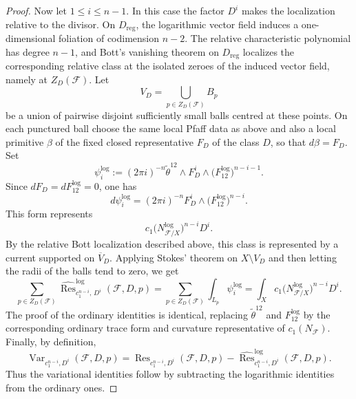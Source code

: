 \documentclass[10pt,a4paper]{amsart}
\newcommand{\cF}{\mathcal{F}}
\begin{document}
\begin{proof}
Now let \(1\leq i\leq n-1\). In this case the factor \(D^i\) makes the
localization relative to the divisor. On \(D_{\mathrm{reg}}\), the logarithmic
vector field induces a one-dimensional foliation of codimension \(n-2\). The
relative characteristic polynomial has degree \(n-1\), and Bott's vanishing
theorem on \(D_{\mathrm{reg}}\) localizes the corresponding relative class at
the isolated zeroes of the induced vector field, namely at \(Z_D(\cF)\).
Let
\[
V_D=\bigcup_{p\in Z_D(\cF)}B_p
\]
be a union of pairwise disjoint sufficiently small balls centred at these
points. On each punctured ball choose the same local Pfaff data as above and
also a local primitive \(\beta\) of the fixed closed representative \(F_D\) of
the class \(D\), so that \(d\beta=F_D\). Set
\[
\psi_i^{\log}
:=
(2\pi i)^{-n}
\widetilde\theta^{12}\wedge
F_D^i\wedge
\bigl(F_{12}^{\log}\bigr)^{n-i-1}.
\]
Since \(dF_D=dF_{12}^{\log}=0\), one has
\[
d\psi_i^{\log}
=
(2\pi i)^{-n}
F_D^i\wedge
\bigl(F_{12}^{\log}\bigr)^{n-i}.
\]
This form represents
\[
c_1\bigl(N_{\cF/X}^{\log}\bigr)^{n-i}D^i.
\]
By the relative Bott localization described above, this class is represented
by a current supported on \(\overline V_D\). Applying Stokes' theorem on
\(X\setminus V_D\) and then letting the radii of the balls tend to zero, we get
\[
\sum_{p\in Z_D(\cF)}
\widehat{\operatorname{Res}}^{\log}_{c_1^{n-i},\,D^i}(\cF,D,p)
=
\sum_{p\in Z_D(\cF)}
\int_{L_p}\psi_i^{\log}
=
\int_X
c_1\bigl(N_{\cF/X}^{\log}\bigr)^{n-i}D^i.
\]
The proof of the ordinary identities is identical, replacing
\(\widetilde\theta^{12}\) and \(F_{12}^{\log}\) by the corresponding ordinary
trace form and curvature representative of \(c_1(N_{\cF})\). Finally, by
definition,
\[
\operatorname{Var}_{c_1^{n-i},D^i}(\cF,D,p)
=
\operatorname{Res}_{c_1^{n-i},D^i}(\cF,D,p)
-
\widehat{\operatorname{Res}}^{\log}_{c_1^{n-i},D^i}(\cF,D,p).
\]
Thus the variational identities follow by subtracting the logarithmic
identities from the ordinary ones.
\end{proof}
\end{document}
